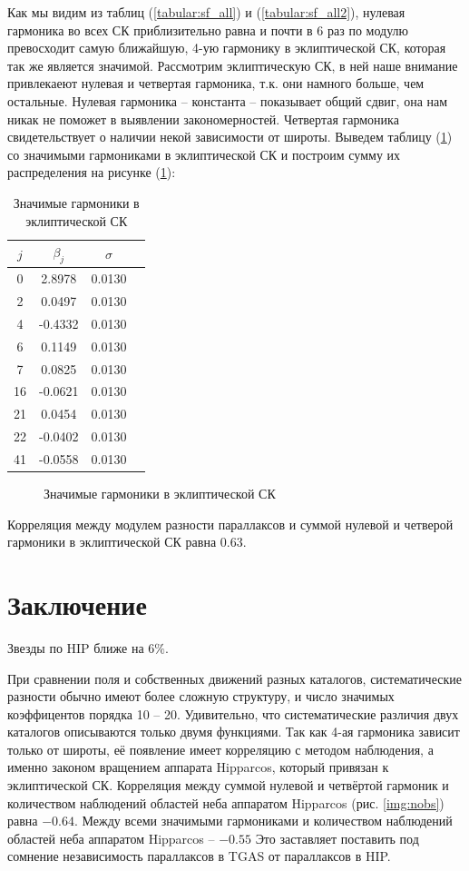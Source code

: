 \documentclass[14pt]{article} %
\begin{document}
Как мы видим из таблиц (\ref{tabular:sf_all}) и (\ref{tabular:sf_all2}), нулевая гармоника во всех СК приблизительно равна и почти в 6 раз по модулю превосходит самую ближайшую, 4-ую гармонику в эклиптической СК, которая так же является значимой. Рассмотрим эклиптическую СК, в ней наше внимание привлекаеют нулевая и четвертая гармоника, т.к. они намного больше, чем остальные. Нулевая гармоника -- константа -- показывает общий сдвиг, она нам никак не поможет  в выявлении закономерностей. Четвертая гармоника свидетельствует о наличии некой зависимости от широты. Выведем таблицу (\ref{tabular:sf_04}) со значимыми гармониками в эклиптической СК и построим сумму их распределения на рисунке (\ref{img:sfff}):

\begin{table}[h]
\centering
\caption{Значимые гармоники в эклиптической СК}
\label{tabular:sf_04}
\begin{tabular}{|c|c|c|c|}
\hline 	
$j$ &$\beta_{j}$ & $\sigma$\\
\hline
\hline
\rowcolor{Gray}  
0 &	2.8978 &0.0130\\
2 &	0.0497&0.0130\\
\rowcolor{Gray} 
4 &	-0.4332&0.0130\\
6	&0.1149&0.0130\\
7	&0.0825&0.0130\\
16	&-0.0621&0.0130\\
21	&0.0454&0.0130\\
22	&-0.0402&0.0130\\
41	&-0.0558&0.0130\\
\hline 	
\end{tabular}
\end{table}

\begin{figure}[h!]
\caption{Значимые гармоники в эклиптической СК}
\label{img:sfff}
\end{figure}

Корреляция между модулем разности параллаксов и суммой нулевой и четверой гармоники в эклиптической СК равна 0.63.


\section{Заключение}\label{conclusion}
Звезды по HIP ближе на $6\%$.

При сравнении поля и собственных движений разных каталогов, систематические разности обычно имеют более сложную структуру, и число значимых коэффицентов порядка 10 -- 20. Удивительно, что систематические различия двух каталогов описываются только двумя функциями. Так как 4-ая гармоника зависит только от широты, её появление имеет корреляцию с методом наблюдения, а именно законом вращением аппарата Hipparcos, который привязан к эклиптической СК. Корреляция между суммой нулевой и четвёртой гармоник и количеством наблюдений областей неба аппаратом Hipparcos (рис. \ref{img:nobs}) равна $-0.64$. Между всеми значимыми гармониками и количеством наблюдений областей неба аппаратом Hipparcos -- $-0.55$ Это заставляет поставить под сомнение независимость параллаксов в TGAS от параллаксов в HIP.
\end{document}
